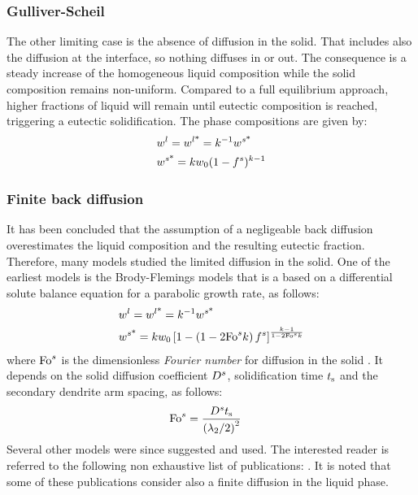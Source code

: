 \subsubsection*{Gulliver-Scheil}
The other limiting case is the absence of diffusion in the solid. That includes also the diffusion at the interface, 
so nothing diffuses in or out. The consequence is a steady increase of the homogeneous liquid composition while the solid composition remains non-uniform.
Compared to a full equilibrium approach, higher fractions of liquid will remain until eutectic composition is reached, 
triggering a eutectic solidification. The phase compositions are given by:
\begin{align}
\label{eq:scheil}
& {w}^l= {w}^{l \text{*}}  = k^{-1} {w}^{s \text{*}}  \\
& {w}^{s \text{*}} = k {w}_0 (1-{f^s})^{k-1}
\end{align}
%
\subsubsection*{Finite back diffusion}
It has been concluded that the assumption of a negligeable back diffusion overestimates the liquid composition
and the resulting eutectic fraction. Therefore, many models studied the limited diffusion in the solid. One of the earliest models is the Brody-Flemings models \citep{khan_influence_2014} that is a based on a differential solute balance equation for a parabolic growth rate, as follows:
\begin{align}
\label{eq:brodyflemings}
& {w}^l= {w}^{l \text{*}}  = k^{-1}  {w}^{s \text{*}}  \\
& {w}^{s \text{*}} = k {w}_0 \left[  1 - \left(  1 - 2 \text{Fo}^s k  \right) {f^s}  \right]^{\frac{k-1}{1 - 2 \text{Fo}^s k }}
\end{align}
where $\text{Fo}^s$ is the dimensionless \emph{Fourier number} for diffusion in the solid \citep{dantzig_solidification_2009}. It depends on the 
solid diffusion coefficient $D^s$, solidification time $t_\text{s}$ and the secondary dendrite arm spacing, as follows: 
\begin{align}
\label{eq:fouriersolid}
& \text{Fo}^s = \frac{D^s t_\text{s}}{\left( {\lambda}_{2} / 2 \right)^2}
\end{align}
Several other models were since suggested and used. The interested reader is referred to the following non 
exhaustive list of publications: \citet{clyne_solute_1981,kobayashi_solute_1988,ni_volume-averaged_1991,wang_multiphase_1993,
combeau_modeling_1996,martorano_solutal_2003,tourret_generalized_2009}. It is noted that some of these publications consider 
also a finite diffusion in the liquid phase.
%
%
